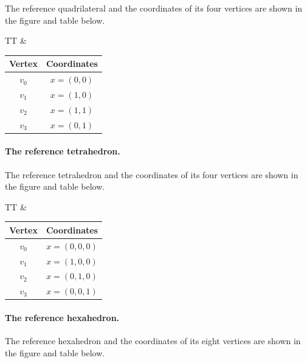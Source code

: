 The reference quadrilateral and the coordinates of its four vertices
are shown in the figure and table below.

\begin{center}
\bwfig
  \begin{tabular}{TT}
    &
    \begin{tabular}{cc}
      \toprule
      Vertex & Coordinates \\
      \hline
      $v_0$ & $x = (0, 0)$ \\
      $v_1$ & $x = (1, 0)$ \\
      $v_2$ & $x = (1, 1)$ \\
      $v_3$ & $x = (0, 1)$ \\
      \bottomrule
    \end{tabular}
  \end{tabular}
\end{center}

\paragraph{The reference tetrahedron.}

The reference tetrahedron and the coordinates of its four vertices are
shown in the figure and table below.

\begin{center}
\bwfig
  \begin{tabular}{TT}
    &
    \begin{tabular}{cc}
      \toprule
      Vertex & Coordinates \\
      \hline
      $v_0$ & $x = (0, 0, 0)$ \\
      $v_1$ & $x = (1, 0, 0)$ \\
      $v_2$ & $x = (0, 1, 0)$ \\
      $v_3$ & $x = (0, 0, 1)$ \\
      \bottomrule
    \end{tabular}
  \end{tabular}
\end{center}

\paragraph{The reference hexahedron.}

The reference hexahedron and the coordinates of its eight vertices are
shown in the figure and table below.

